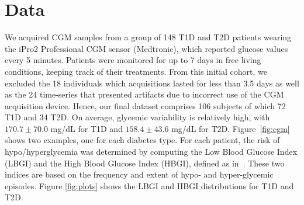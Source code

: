 \section{Data}
%



We acquired CGM samples from a group of 148 T1D and T2D patients wearing the iPro\textsuperscript{\footnotesize \textregistered}2 Professional CGM sensor (Medtronic), which reported glucose values every 5 minutes. Patients were monitored for up to 7 days in  free living conditions, keeping track of their treatments. %
From this initial cohort, we excluded the 18 individuals which acquisitions lasted for less than 3.5 days as well as the 24 time-series that presented artifacts due to incorrect use of the CGM acquisition device. Hence, our final dataset comprises 106 subjects of which 72 T1D and 34 T2D. 
On average, glycemic variability is relatively high, with $170.7\pm 70.0$ mg/dL for T1D and $158.4\pm 43.6$ mg/dL for T2D. Figure~\ref{fig:cgm} shows two examples, one for each diabetes type.
For each patient, the risk of hypo/hyperglycemia was determined by computing the Low Blood Glucose Index (LBGI) and the High Blood Glucose Index (HBGI), defined as in~\cite{fabris2016risk}. These two indices are based on the frequency and extent of hypo- and hyper-glycemic episodes. Figure \ref{fig:plots} shows the LBGI and HBGI distributions for T1D and T2D. 

